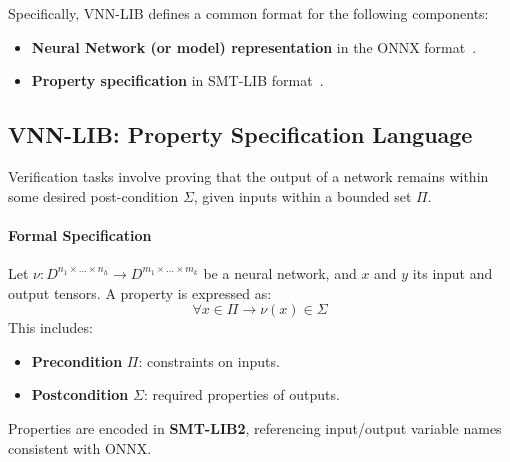\documentclass[oneside,11pt,dvipsnames]{book}
\numberwithin{equation}{section}
\theoremstyle{definition}
\theoremstyle{remark}
\begin{document}
Specifically, VNN-LIB defines a common format for the following components:
\begin{itemize}
    \item \textbf{Neural Network (or model) representation} in the ONNX format~\cite{onnx}.
    \item \textbf{Property specification} in SMT-LIB format~\cite{barrett2010smt}.
\end{itemize}



\subsection{VNN-LIB: Property Specification Language}

Verification tasks involve proving that the output of a network remains within some desired post-condition $\Sigma$, given inputs within a bounded set $\Pi$.

\paragraph{Formal Specification}
Let $\nu: D^{n_1 \times \dots \times n_h} \to D^{m_1 \times \dots \times m_k}$ be a neural network, and $x$ and $y$ its input and output tensors. A property is expressed as:
\[
\forall x \in \Pi \rightarrow \nu(x) \in \Sigma
\]
This includes:
\begin{itemize}
    \item \textbf{Precondition} $\Pi$: constraints on inputs.
    \item \textbf{Postcondition} $\Sigma$: required properties of outputs.
\end{itemize}

Properties are encoded in \textbf{SMT-LIB2}, referencing input/output variable names consistent with ONNX.
\end{document}
